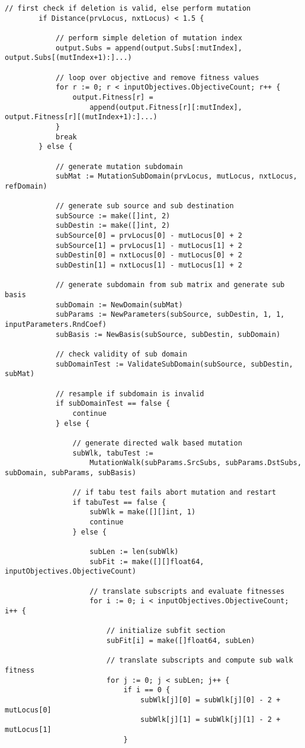 \begin{lstlisting}[basicstyle=\tiny]
		// first check if deletion is valid, else perform mutation
		if Distance(prvLocus, nxtLocus) < 1.5 {

			// perform simple deletion of mutation index
			output.Subs = append(output.Subs[:mutIndex], output.Subs[(mutIndex+1):]...)

			// loop over objective and remove fitness values
			for r := 0; r < inputObjectives.ObjectiveCount; r++ {
				output.Fitness[r] = 
				    append(output.Fitness[r][:mutIndex], output.Fitness[r][(mutIndex+1):]...)
			}
			break
		} else {

			// generate mutation subdomain
			subMat := MutationSubDomain(prvLocus, mutLocus, nxtLocus, refDomain)

			// generate sub source and sub destination
			subSource := make([]int, 2)
			subDestin := make([]int, 2)
			subSource[0] = prvLocus[0] - mutLocus[0] + 2
			subSource[1] = prvLocus[1] - mutLocus[1] + 2
			subDestin[0] = nxtLocus[0] - mutLocus[0] + 2
			subDestin[1] = nxtLocus[1] - mutLocus[1] + 2

			// generate subdomain from sub matrix and generate sub basis
			subDomain := NewDomain(subMat)
			subParams := NewParameters(subSource, subDestin, 1, 1, inputParameters.RndCoef)
			subBasis := NewBasis(subSource, subDestin, subDomain)

			// check validity of sub domain
			subDomainTest := ValidateSubDomain(subSource, subDestin, subMat)

			// resample if subdomain is invalid
			if subDomainTest == false {
				continue
			} else {

				// generate directed walk based mutation
				subWlk, tabuTest := 
				    MutationWalk(subParams.SrcSubs, subParams.DstSubs, subDomain, subParams, subBasis)

				// if tabu test fails abort mutation and restart
				if tabuTest == false {
					subWlk = make([][]int, 1)
					continue
				} else {

					subLen := len(subWlk)
					subFit := make([][]float64, inputObjectives.ObjectiveCount)

					// translate subscripts and evaluate fitnesses
					for i := 0; i < inputObjectives.ObjectiveCount; i++ {

						// initialize subfit section
						subFit[i] = make([]float64, subLen)

						// translate subscripts and compute sub walk fitness
						for j := 0; j < subLen; j++ {
							if i == 0 {
								subWlk[j][0] = subWlk[j][0] - 2 + mutLocus[0]
								subWlk[j][1] = subWlk[j][1] - 2 + mutLocus[1]
							}


\end{lstlisting}
